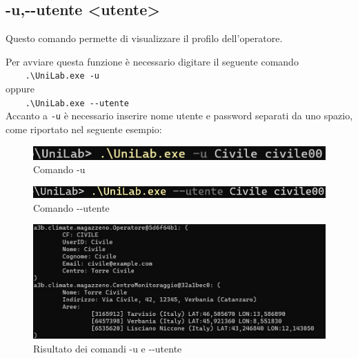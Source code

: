\documentclass[12pt]{scrreprt}
\begin{document}
		\subsection{-u,-$ $-utente <utente>}
		Questo comando permette di visualizzare il profilo dell'operatore.
		
		Per avviare questa funzione \`e necessario digitare il seguente comando
		\\\verb!    .\UniLab.exe -u! \\
		oppure
		\\\verb!    .\UniLab.exe --utente!\\
		Accanto a \verb!-u! \`e necessario inserire nome utente e password separati da uno spazio, come riportato nel seguente esempio:
		\begin{figure}[H]
			\centering
			\includegraphics[width=0.5\linewidth]{Screen/ucom}
			\caption{Comando -u}
			\label{fig:ucom}
		\end{figure}
		\begin{figure}[H]
			\centering
			\includegraphics[width=0.6\linewidth]{Screen/utentecom}
			\caption{Comando -$ $-utente}
			\label{fig:utentecom}
		\end{figure}
		
		\begin{figure}[H]
			\centering
			\includegraphics[width=0.9\linewidth]{Screen/utente}
			\caption{Risultato dei comandi -u e -$ $-utente}
			\label{fig:utente}
		\end{figure}
		
	\newpage
\end{document}
